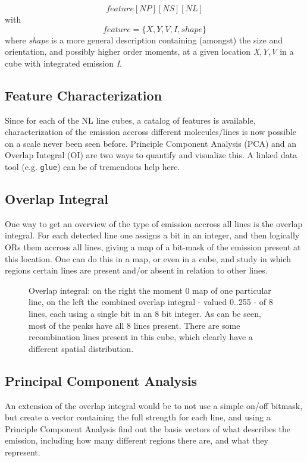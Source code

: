 \documentclass[preprint]{aastex} %
\begin{document}
$$
   feature[NP][NS][NL]
$$
with
$$
   feature = \{X, Y, V, I, shape\}
$$
where {\it shape} is a more general description containing (amongst) the size
and orientation, and possibly higher order moments, at a given location
{\it X,Y,V} in a cube with integrated emission {\it I}. 


\subsection{Feature Characterization}

Since for each of the NL line cubes, a catalog of features is available,
characterization of the emission accross different molecules/lines is now 
possible on a scale never been seen before. Principle Component
Analysis (PCA) and an Overlap Integral (OI) are two ways to quantify
and visualize this. A linked data tool (e.g. {\tt glue}) can be 
of tremendous help here.

\subsection{Overlap Integral}

One way to get an overview of the type of emission accross all lines
is the overlap integral.
For each detected line one assigns a bit in an integer, and then logically ORs
them accross all lines, giving a map of a bit-mask of the emission present
at this location. One can do this in a map, or even in a cube, and study
in which regions certain lines are present and/or absent in relation
to other lines.

\begin{figure}[ht]
\caption{Overlap integral: on the right the moment 0 map of one particular line,
on the left the combined overlap integral - valued 0..255 - of 8 lines, each
using a single bit in an 8 bit integer. As can be seen, most of the peaks
have all 8 lines present. There are some recombination lines present in this
cube, which clearly have a different spatial distribution.}
\label{fig:overlap}
\end{figure}



\subsection{Principal Component Analysis}

An extension of the overlap integral would be to not use a simple on/off bitmask,
but create a vector containing the full strength for each line, and using
a Principle Component Analysis find out the basis vectors of what describes
the emission, including how many different regions there are, and what they
represent.
\end{document}
